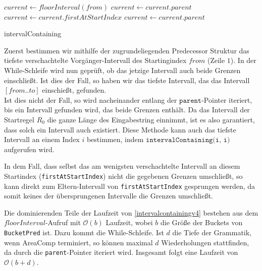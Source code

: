 \begin{algorithm}[t]
    $current \leftarrow floorInterval(from)$
     {
         {
        }
         {
            $current \leftarrow current.parent$\;
        }{
            $current \leftarrow current.firstAtStartIndex$\;
             {
                $current \leftarrow current.parent$ 
            }
        }
    }
    \KwRet{\KwNull}
    \caption{intervalContaining}
    \label{intervalcontainingv4}
\end{algorithm}

Zuerst bestimmen wir mithilfe der zugrundeliegenden Predecessor Struktur das tiefste verschachtelte Vorgänger-Intervall des Startingindex $from$ (Zeile $1$). 
In der While-Schleife wird nun geprüft, ob das jetzige Intervall auch beide Grenzen einschließt. Ist dies der Fall, so haben wir das tiefste Intervall, das das Intervall $[from..to]$ einschießt, gefunden.\\
Ist dies nicht der Fall, so wird nacheinander entlang der $\texttt{parent}$-Pointer iteriert, bis ein Intervall gefunden wird, das beide Grenzen enthält. Da das Intervall der Startregel $R_0$ die ganze Länge des Eingabestring einnimmt, ist es also garantiert, dass solch ein Intervall auch existiert. Diese Methode kann auch das tiefste Intervall an einem Index $i$ bestimmen, indem $\texttt{intervalContaining(i, i)}$ aufgerufen wird.

In dem Fall, dass selbst das am wenigsten verschachtelte Intervall an diesem Startindex (\texttt{firstAtStartIndex}) nicht die gegebenen Grenzen umschließt, so kann direkt zum Eltern-Intervall von \texttt{firstAtStartIndex} gesprungen werden, da somit keines der übersprungenen Intervalle die Grenzen umschließt.

Die dominierenden Teile der Laufzeit von \autoref{intervalcontainingv4} bestehen aus dem $floorInterval$-Aufruf mit $\mathcal{O}(b)$ Laufzeit, wobei $b$ die Größe der Buckets von \texttt{BucketPred} ist. Dazu kommt die While-Schleife. 
Ist $d$ die Tiefe der Grammatik, wenn AreaComp terminiert, so können maximal $d$ Wiederholungen stattfinden, da durch die \texttt{parent}-Pointer iteriert wird. Insgesamt folgt eine Laufzeit von $\mathcal{O}(b + d)$. 

